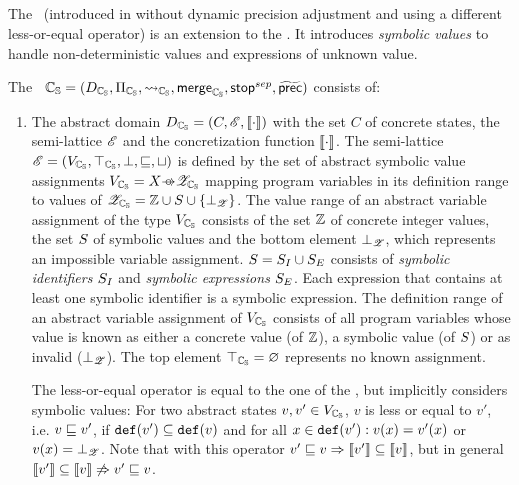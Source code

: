 \subsection{\SymbolicValueAnalysisCPA}\label{sec:symValCPA}
The \symbolicValueAnalysisCPA\ (introduced in \cite{Lemberger2015} without dynamic precision adjustment and using a different less-or-equal operator) is an extension to the . It introduces \emph{symbolic values} to handle non-deterministic values and expressions of unknown value.

The \symbolicValueAnalysisCPA\ $\mathbb{C_{S}} = (D_{\mathbb{C_{S}}}, \Pi_{\mathbb{C_{S}}}, \rightsquigarrow_{\mathbb{C_{S}}}, \operatorname{\operatorname{\mathsf{merge}}}_{\mathbb{C_{S}}}, \operatorname{\operatorname{\mathsf{stop}}}^{sep}, \operatorname{\widetilde{\operatorname{\operatorname{\mathsf{prec}}}}})$ consists of:
\begin{enumerate}[leftmargin=*, label=\arabic*.]
\item The abstract domain $D_{\mathbb{C_{S}}} = (C, \mathscr{E}, \llbracket \cdot \rrbracket)$ with the set $C$ of concrete states,
	the semi-lattice $\mathscr{E}$ and
	the concretization function $\llbracket \cdot \rrbracket$.
	The semi-lattice $\mathscr{E} = (V_{\mathbb{C_{S}}}, \top_{\mathbb{C_{S}}}, \bot, \sqsubseteq, \sqcup)$ is defined by
	the set of abstract symbolic value assignments $\symvalAssignment = X \partialFunc \symvalset$ mapping program variables in its definition range to values of
	${\mathscr{Z}_{\mathbb{C_{S}}}} = \mathbb{Z} \cup S \cup \{ \bot_{\mathscr{Z}} \}$.
	The value range of an abstract variable assignment of the type $V_{\mathbb{C_{S}}}$ consists of the set $\mathbb{Z}$ of concrete integer values,
	the set $S$ of symbolic values and the bottom element $\bot_{\mathscr{Z}}$, which represents an impossible variable assignment.
	$S = S_I \cup S_E$ consists of \emph{symbolic identifiers} $S_I$ and \emph{symbolic expressions} $S_E$.
	Each expression that contains at least one symbolic identifier is a symbolic expression.
	The definition range of an abstract variable assignment of $V_{\mathbb{C_{S}}}$ consists of all program variables whose value is known as either a concrete value (of $\mathbb{Z}$),
	a symbolic value (of $S$) or as invalid ($\bot_{\mathscr{Z}}$).
	The top element $\top_{\mathbb{C_{S}}} = \varnothing$ represents no known assignment.

  The less-or-equal operator is equal to the one of the , but implicitly considers symbolic values:
	For two abstract states $v, v' \in V_{\mathbb{C_{S}}}$, $v$ is less or equal to $v'$, i.e. $v \sqsubseteq v'$, if $\texttt{def}(v') \subseteq \texttt{def}(v)$ and for all $x \in \texttt{def}(v'): v(x) = v'(x)$ or $v(x) = \bot_{\mathscr{Z}}$.
	Note that with this operator $v' \sqsubseteq v \Rightarrow \llbracket v' \rrbracket \subseteq \llbracket v \rrbracket$, but in general $\llbracket v' \rrbracket \subseteq \llbracket v \rrbracket \not\Rightarrow v' \sqsubseteq v$.


\end{enumerate}

